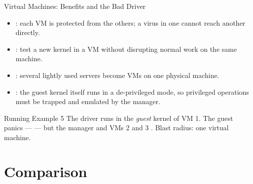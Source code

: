 \documentclass[aspectratio=169]{beamer}
\begin{document}
\begin{frame}{Virtual Machines: Benefits and the Bad Driver}
  \begin{itemize}
    \item {}: each VM is protected from the others; a virus in
      one cannot reach another directly.
    \item {}: test a new kernel in a VM without
      disrupting normal work on the same machine.
    \item {}: several lightly used servers become VMs on one
      physical machine.
    \item {}: the guest kernel itself runs in a de-privileged mode, so
      privileged operations must be trapped and emulated by the manager.
  \end{itemize}
  \vspace{0.15cm}
  \begin{exampleblock}{Running Example 5}
    The driver runs in the \emph{guest} kernel of VM 1. The guest panics ---
     --- but the manager and VMs 2 and 3
    . Blast radius: one virtual machine.
  \end{exampleblock}
\end{frame}

\section{Comparison}
\end{document}

